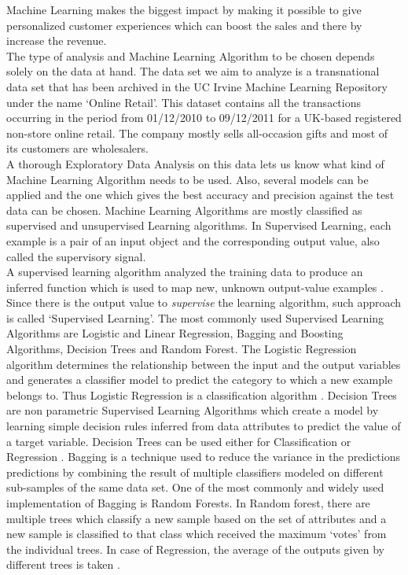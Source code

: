 Machine Learning makes the biggest impact by making it possible to give personalized customer experiences which can boost the sales and there by increase the revenue.\\ 
The type of analysis and Machine Learning Algorithm to be chosen depends solely on the data at hand. The data set we aim to analyze is a transnational data set that has been archived in the UC Irvine Machine Learning Repository under the name `Online Retail'. This dataset contains all the transactions occurring in the period from 01/12/2010 to 09/12/2011 for a UK-based registered non-store online retail. The company mostly sells all-occasion gifts and most of its customers are wholesalers. \\

A thorough Exploratory Data Analysis on this data lets us know what kind of Machine Learning Algorithm needs to be used. Also, several models can be applied and the one which gives the best accuracy and precision against the test data can be chosen. Machine Learning Algorithms are mostly classified as supervised and unsupervised Learning algorithms. In Supervised Learning, each example is a pair of an input object and the corresponding output value, also called the supervisory signal. \\
A supervised learning algorithm analyzed the training data to produce an inferred function which is used to map new, unknown output-value examples \cite{link6}. Since there is the output value to \emph{supervise} the learning algorithm, such approach is called `Supervised Learning'. The most commonly used Supervised Learning Algorithms are Logistic and Linear Regression, Bagging and Boosting Algorithms, Decision Trees and Random Forest. The Logistic Regression algorithm determines the relationship between the input and the output variables and generates a classifier model to predict the category to which a new example belongs to. Thus Logistic Regression is a classification algorithm \cite{link7}. Decision Trees are non parametric Supervised Learning Algorithms which create a model by learning simple decision rules inferred from data attributes to predict the value of a target variable. Decision Trees can be used either for Classification or Regression \cite{link8}. Bagging is a technique used to reduce the variance in the predictions predictions by combining the result of multiple classifiers modeled on different sub-samples of the same data set. One of the most commonly and widely used implementation of Bagging is Random Forests. In Random forest, there are multiple trees which classify a new sample based on the set of attributes and a new sample is classified to that class which received the maximum `votes' from the individual trees. In case of Regression, the average of the outputs given by different trees is taken  \cite{link9}.\\
